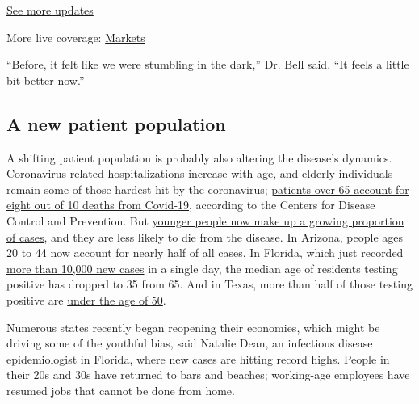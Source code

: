 \href{https://www.nytimes.com/2020/08/04/world/coronavirus-cases.html?action=click\&pgtype=Article\&state=default\&region=MAIN_CONTENT_1\&context=storylines_live_updates}{See
more updates}

More live coverage:
\href{https://www.nytimes.com/live/2020/08/04/business/stock-market-today-coronavirus?action=click\&pgtype=Article\&state=default\&region=MAIN_CONTENT_1\&context=storylines_live_updates}{Markets}

``Before, it felt like we were stumbling in the dark,'' Dr. Bell said.
``It feels a little bit better now.''

\hypertarget{a-new-patient-population}{%
\subsection{A new patient population}\label{a-new-patient-population}}

A shifting patient population is probably also altering the disease's
dynamics. Coronavirus-related hospitalizations
\href{https://www.cdc.gov/coronavirus/2019-ncov/covid-data/covidview/index.html}{increase
with age}, and elderly individuals remain some of those hardest hit by
the coronavirus;
\href{https://www.cdc.gov/coronavirus/2019-ncov/need-extra-precautions/older-adults.html}{patients
over 65 account for eight out of 10 deaths from Covid-19}, according to
the Centers for Disease Control and Prevention. But
\href{https://www.nytimes.com/2020/06/25/us/coronavirus-cases-young-people.html}{younger
people now make up a growing proportion of cases}, and they are less
likely to die from the disease. In Arizona, people ages 20 to 44 now
account for nearly half of all cases. In Florida, which just recorded
\href{https://www.reuters.com/article/us-health-coronavirus-usa-florida/florida-shatters-records-with-over-10000-new-covid-19-cases-in-single-day-idUSKBN243299}{more
than 10,000 new cases} in a single day, the median age of residents
testing positive has dropped to 35 from 65. And in Texas, more than half
of those testing positive are
\href{https://txdshs.maps.arcgis.com/apps/opsdashboard/index.html\#/ed483ecd702b4298ab01e8b9cafc8b83}{under
the age of 50}.

Numerous states recently began reopening their economies, which might be
driving some of the youthful bias, said Natalie Dean, an infectious
disease epidemiologist in Florida, where new cases are hitting record
highs. People in their 20s and 30s have returned to bars and beaches;
working-age employees have resumed jobs that cannot be done from home.

